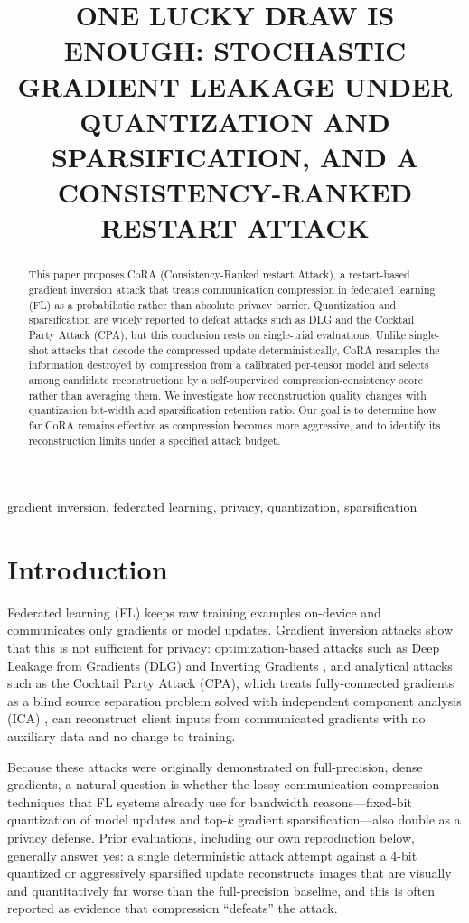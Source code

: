 \documentclass{article}
\title{ONE LUCKY DRAW IS ENOUGH: STOCHASTIC GRADIENT LEAKAGE UNDER\\
QUANTIZATION AND SPARSIFICATION, AND A CONSISTENCY-RANKED RESTART ATTACK}
\begin{document}
\maketitle

\begin{abstract}
This paper proposes CoRA (Consistency-Ranked restart Attack), a restart-based
gradient inversion attack that treats communication compression in federated
learning (FL) as a probabilistic rather than absolute privacy barrier.
Quantization and sparsification are widely reported to defeat attacks such as
DLG and the Cocktail Party Attack (CPA), but this conclusion rests on
single-trial evaluations. Unlike single-shot attacks that decode the compressed
update deterministically, CoRA resamples the information destroyed by
compression from a calibrated per-tensor model and selects among candidate
reconstructions by a self-supervised compression-consistency score rather than
averaging them. We investigate how reconstruction quality changes with quantization
bit-width and sparsification retention ratio. Our goal is to determine
how far CoRA remains effective as compression becomes more aggressive,
and to identify its reconstruction limits under a specified attack budget.

\end{abstract}

\begin{keywords}
gradient inversion, federated learning, privacy, quantization, sparsification
\end{keywords}

\section{Introduction}
Federated learning (FL) keeps raw training examples on-device and
communicates only gradients or model updates. Gradient inversion attacks show
that this is not sufficient for privacy: optimization-based attacks such as
Deep Leakage from Gradients (DLG) \cite{zhu2019deep} and Inverting Gradients
\cite{geiping2020inverting}, and analytical attacks such as the Cocktail
Party Attack (CPA), which treats fully-connected gradients as a blind source
separation problem solved with independent component analysis (ICA)
\cite{kariyappa2023cocktail}, can reconstruct client inputs from communicated
gradients with no auxiliary data and no change to training.

Because these attacks were originally demonstrated on full-precision, dense
gradients, a natural question is whether the lossy communication-compression
techniques that FL systems already use for bandwidth reasons---fixed-bit
quantization of model updates and top-$k$ gradient sparsification---also
double as a privacy defense. Prior evaluations, including our own
reproduction below, generally answer yes: a single deterministic attack
attempt against a 4-bit quantized or aggressively sparsified update
reconstructs images that are visually and quantitatively far worse than the
full-precision baseline, and this is often reported as evidence that
compression ``defeats'' the attack.
\end{document}
